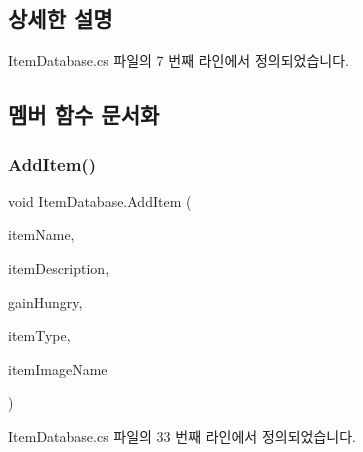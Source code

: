 \subsection{상세한 설명}


Item\+Database.\+cs 파일의 7 번째 라인에서 정의되었습니다.



\subsection{멤버 함수 문서화}
\mbox{\label{class_item_database_a20404bd6d9530cff940b950b9a89ef4e}} 
\subsubsection{\texorpdfstring{AddItem()}{AddItem()}}
{\footnotesize\ttfamily void Item\+Database.\+Add\+Item (\begin{DoxyParamCaption}\item[{string}]{item\+Name,  }\item[{string}]{item\+Description,  }\item[{int}]{gain\+Hungry,  }\item[{\mbox{\hyperlink{class_item_ab5eeb575e9d66ebcfef9b58b667fad05}{Item.\+Item\+Type}}}]{item\+Type,  }\item[{string}]{item\+Image\+Name }\end{DoxyParamCaption})}



Item\+Database.\+cs 파일의 33 번째 라인에서 정의되었습니다.


